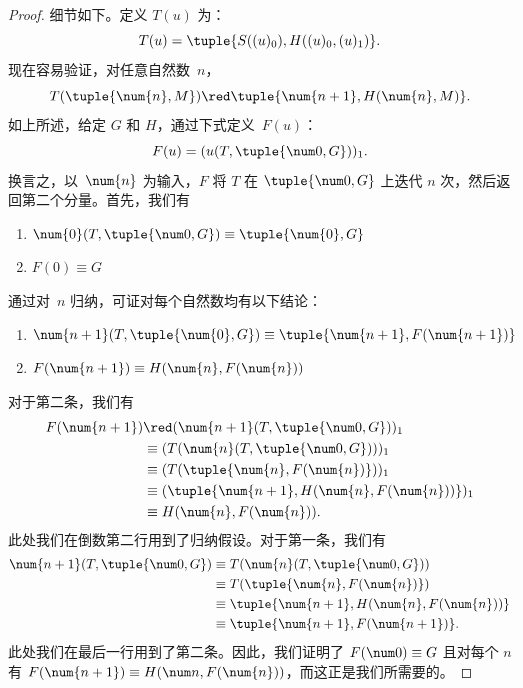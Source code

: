 \documentclass[../../../include/open-logic-section]{subfiles}
\begin{document}
\begin{proof}
细节如下。定义 $T(u)$ 为：
\[
T(u) = \tuple{S((u)_0), H((u)_0,(u)_1)}.
\]
现在容易验证，对任意自然数~$n$，
\[
T(\tuple{\num{n}, M}) \red \tuple{\num{n+1}, H(\num{n}, M)}.
\]
如上所述，给定 $G$ 和 $H$，通过下式定义~$F(u)$：
\[
F(u) = (u(T,\tuple{\num 0, G}))_1.
\]
换言之，以~$\num{n}$ 为输入，$F$ 将 $T$ 在 $\tuple{\num 0, G}$ 上迭代 $n$ 次，然后返回第二个分量。首先，我们有
\begin{enumerate}
\item $\num{0} (T, \tuple{\num 0, G}) \equiv \tuple{\num{0}, G}$
\item $F(\num{0}) \equiv G$
\end{enumerate}
通过对~$n$ 归纳，可证对每个自然数均有以下结论：
\begin{enumerate}
\item $\num{n+1}(T, \tuple{\num{0}, G}) \equiv \tuple{\num{n+1}, F(\num{n+1})}$
\item $F(\num{n+1}) \equiv H(\num{n}, F(\num{n}))$
\end{enumerate}
对于第二条，我们有
\begin{align*}
F(\num{n+1}) & \red (\num{n+1}(T, \tuple{\num 0, G}))_1 \\
& \equiv (T(\num{n} (T, \tuple{\num 0, G})))_1 \\
& \equiv (T(\tuple{\num{n}, F(\num{n})}))_1 \\
& \equiv (\tuple{\num{n+1}, H(\num{n}, F(\num{n}))})_1 \\
& \equiv H(\num{n}, F(\num{n})).
\end{align*}
此处我们在倒数第二行用到了归纳假设。对于第一条，我们有
\begin{align*}
\num{n+1} (T, \tuple{\num 0, G}) &
\equiv T(\num{n} (T, \tuple{\num 0, G})) \\
& \equiv T( \tuple{\num{n}, F(\num{n})}) \\
& \equiv \tuple{\num{n+1}, H(\num{n}, F(\num{n}))} \\
& \equiv \tuple{\num{n+1}, F(\num{n+1})}.
\end{align*}
此处我们在最后一行用到了第二条。因此，我们证明了 $F(\num 0) \equiv G$ 且对每个 $n$ 有 $F(\num {n+1}) \equiv H(\num
n, F(\num{n}))$，而这正是我们所需要的。
\end{proof}
\end{document}
